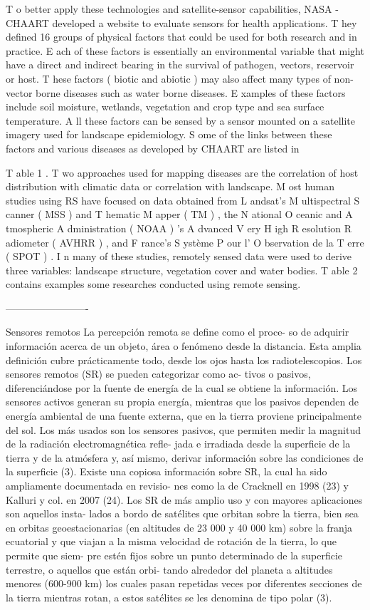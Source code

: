T o better apply these technologies and satellite-sensor
capabilities, NASA - CHAART developed a website to
evaluate sensors for health applications. T hey defined
16 groups of physical factors that could be used for both
research and in practice. E ach of these factors is essentially
an environmental variable that might have a direct and
indirect bearing in the survival of pathogen, vectors,
reservoir or host. T hese factors ( biotic and abiotic ) may
also affect many types of non-vector borne diseases such
as water borne diseases. E xamples of these factors include
soil moisture, wetlands, vegetation and crop type and sea
surface temperature. A ll these factors can be sensed by a
sensor mounted on a satellite imagery used for landscape
epidemiology. S ome of the links between these factors and
various diseases as developed by CHAART are listed in

T able 1 .
T wo approaches used for mapping diseases are the
correlation of host distribution with climatic data or
correlation with landscape. M ost human studies using RS
have focused on data obtained from L andsat’s M ultispectral
S canner ( MSS ) and T hematic M apper ( TM ) , the N ational
O ceanic and A tmospheric A dministration ( NOAA ) ’s
A dvanced V ery H igh R esolution R adiometer ( AVHRR ) , and
F rance’s S ystème P our l’ O bservation de la T erre ( SPOT ) .
I n many of these studies, remotely sensed data were used
to derive three variables: landscape structure, vegetation
cover and water bodies. T able 2 contains examples some
researches conducted using remote sensing.

-------------------------


Sensores remotos
La percepción remota se define como el proce-
so de adquirir información acerca de un objeto,
área o fenómeno desde la distancia. Esta amplia
definición cubre prácticamente todo, desde los
ojos hasta los radiotelescopios. Los sensores
remotos (SR) se pueden categorizar como ac-
tivos o pasivos, diferenciándose por la fuente
de energía de la cual se obtiene la información.
Los sensores activos generan su propia energía,
mientras que los pasivos dependen de energía
ambiental de una fuente externa, que en la tierra
proviene principalmente del sol. Los más usados
son los sensores pasivos, que permiten medir la
magnitud de la radiación electromagnética refle-
jada e irradiada desde la superficie de la tierra y
de la atmósfera y, así mismo, derivar información
sobre las condiciones de la superficie (3).
Existe una copiosa información sobre SR, la cual
ha sido ampliamente documentada en revisio-
nes como la de Cracknell en 1998 (23) y Kalluri
y col. en 2007 (24). Los SR de más amplio uso
y con mayores aplicaciones son aquellos insta-
lados a bordo de satélites que orbitan sobre la
tierra, bien sea en orbitas geoestacionarias (en
altitudes de 23 000 y 40 000 km) sobre la franja
ecuatorial y que viajan a la misma velocidad de
rotación de la tierra, lo que permite que siem-
pre estén fijos sobre un punto determinado de
la superficie terrestre, o aquellos que están orbi-
tando alrededor del planeta a altitudes menores
(600-900 km) los cuales pasan repetidas veces
por diferentes secciones de la tierra mientras
rotan, a estos satélites se les denomina de tipo
polar (3).


